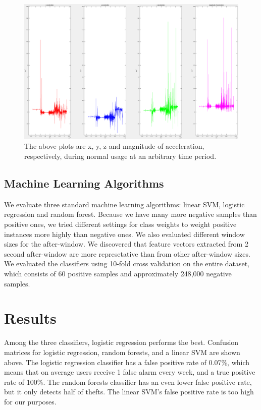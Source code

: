 \documentclass{soups}
\begin{document}
\begin{figure}[t]
\includegraphics[width=1.0\columnwidth]{neg_acc_separated.png}
\caption{The above plots are x, y, z and magnitude of acceleration, respectively, during normal usage at an arbitrary time period.}
\end{figure}



\subsection{Machine Learning Algorithms}
We evaluate three standard machine learning algorithms: linear SVM, logistic regression and random forest.
Because we have many more negative samples than positive ones, we tried different settings for class weights to weight positive instances more highly than negative ones.
We also evaluated different window sizes for the after-window.
We discovered that feature vectors extracted from 2 second after-window are more represetative than from other after-window sizes.
We evaluated the classifiers using 10-fold cross validation on the entire dataset, which consists of 60 positive samples and approximately 248,000 negative samples. 



\section{Results}
Among the three classifiers, logistic regression performs the best.
Confusion matrices for logistic regression, random forests, and a linear SVM
are shown above.
The logistic regression classifier has a false positive rate of 0.07\%, which means that on average users receive 1 false alarm every week, and a true positive rate of 100\%.
The random forests classifier has an even lower false positive rate,
but it only detects half of thefts.
The linear SVM's false positive rate is too high for our purposes.
\end{document}

